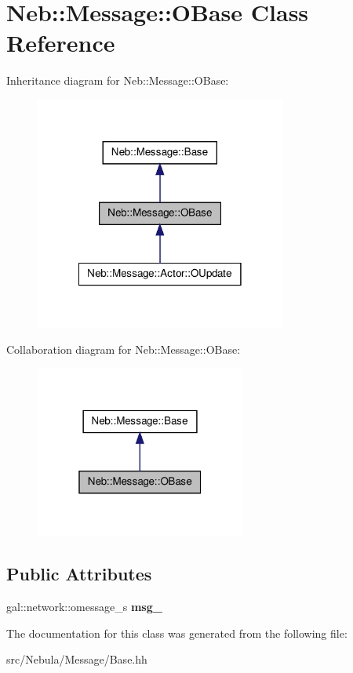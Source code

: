\hypertarget{classNeb_1_1Message_1_1OBase}{\section{\-Neb\-:\-:\-Message\-:\-:\-O\-Base \-Class \-Reference}
\label{classNeb_1_1Message_1_1OBase}
}


\-Inheritance diagram for \-Neb\-:\-:\-Message\-:\-:\-O\-Base\-:\nopagebreak
\begin{figure}[H]
\begin{center}
\leavevmode
\includegraphics[width=234pt]{classNeb_1_1Message_1_1OBase__inherit__graph}
\end{center}
\end{figure}


\-Collaboration diagram for \-Neb\-:\-:\-Message\-:\-:\-O\-Base\-:\nopagebreak
\begin{figure}[H]
\begin{center}
\leavevmode
\includegraphics[width=196pt]{classNeb_1_1Message_1_1OBase__coll__graph}
\end{center}
\end{figure}
\subsection*{\-Public \-Attributes}
\begin{DoxyCompactItemize}
\item 
\hypertarget{classNeb_1_1Message_1_1OBase_a1c931edd23c75b30ee0c328e375dd67d}{gal\-::network\-::omessage\-\_\-s {\bfseries msg\-\_\-}}\label{classNeb_1_1Message_1_1OBase_a1c931edd23c75b30ee0c328e375dd67d}

\end{DoxyCompactItemize}


\-The documentation for this class was generated from the following file\-:\begin{DoxyCompactItemize}
\item 
src/\-Nebula/\-Message/\-Base.\-hh\end{DoxyCompactItemize}
